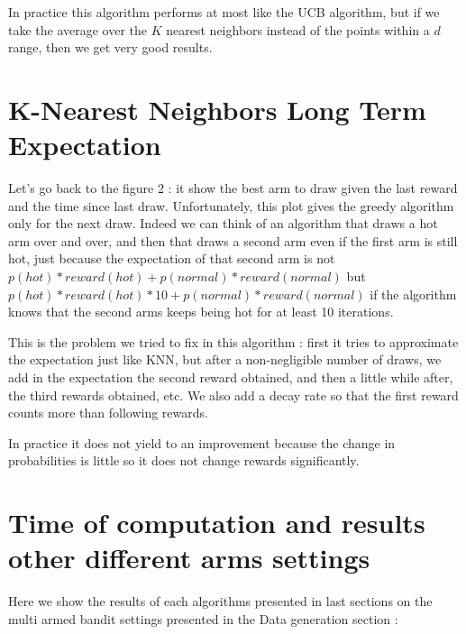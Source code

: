 \documentclass{article} %
\begin{document}
In practice this algorithm performs at most like the UCB algorithm, but if we take the average over the $K$ nearest neighbors instead of the points within a $d$ range, then we get very good results.

\section{K-Nearest Neighbors Long Term Expectation}

Let's go back to the figure 2 : it show the best arm to draw given the last reward and the time since last draw. Unfortunately, this plot gives the greedy algorithm only for the next draw. Indeed we can think of an algorithm that draws a hot arm over and over, and then that draws a second arm even if the first arm is still hot, just because the expectation of that second arm is not $p(hot)*reward(hot) + p(normal)*reward(normal)$ but $p(ho	t)*reward(hot)*10 + p(normal)*reward(normal)$ if the algorithm knows that the second arms keeps being hot for at least 10 iterations.

This is the problem we tried to fix in this algorithm : first it tries to approximate the expectation just like KNN, but after a non-negligible number of draws, we add in the expectation the second reward obtained, and then a little while after, the third rewards obtained, etc. We also add a decay rate so that the first reward counts more than following rewards.

In practice it does not yield to an improvement because the change in probabilities is little so it does not change rewards significantly.


\section{Time of computation and results other different arms settings}

Here we show the results of each algorithms presented in last sections on the multi armed bandit settings presented in the Data generation section :
\end{document}
